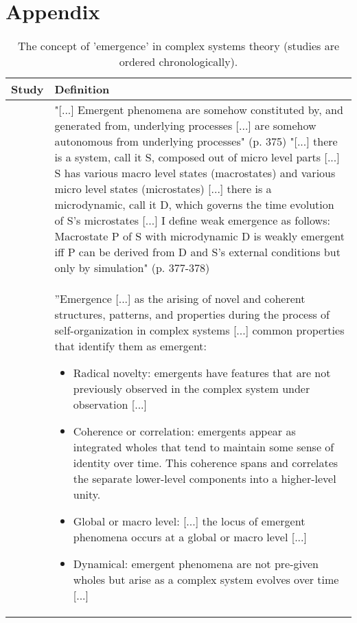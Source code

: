 \documentclass[11pt]{article}
\begin{document}
\newpage
\singlespace




\newpage
\section*{Appendix}
\setcounter{table}{0}
\renewcommand{\thetable}{A\arabic{table}}

\setlength{\tabcolsep}{10pt}
\renewcommand{\arraystretch}{1.5}
\begin{table}[h]\footnotesize
	\caption{\label{tab:emergence}The concept of 'emergence' in complex systems theory (studies are ordered chronologically).}
	\centering
{\begin{tabular}{C{2cm}p{13.5cm}}
\hline\hline
\textbf{Study} & \textbf{Definition}\\
\hline
\cite{Bedau1997} & "[...] Emergent phenomena are somehow constituted by, and generated from, underlying processes [...] are somehow autonomous from underlying processes" (p. 375) 
"[...] there is a system, call it S, composed out of micro level parts [...] S has various macro level states (macrostates) and various micro level states (microstates) [...] there is a microdynamic, call it D, which governs the time evolution of S's microstates [...] I define weak emergence as follows: Macrostate P of S with microdynamic D is weakly emergent iff P can be derived from D and S's external conditions but only by simulation" (p. 377-378)\\
\cite{Goldstein1999} & ''Emergence [...] as the arising of novel and coherent structures, patterns, and properties during the process of self-organization in complex systems [...] common properties that identify them as emergent: 
\begin{itemize}
\item Radical novelty: emergents have features that are not previously observed in the complex system under observation [...]
\item Coherence or correlation: emergents appear as integrated wholes that tend to maintain some sense of identity over time. This coherence spans and correlates the separate lower-level components into a higher-level unity.
\item Global or macro level: [...] the locus of emergent phenomena occurs at a global or macro level [...]
\item Dynamical: emergent phenomena are not pre-given wholes but arise as a complex system evolves over time [...]

\end{itemize}
\end{tabular}}
\end{table}
\end{document}
